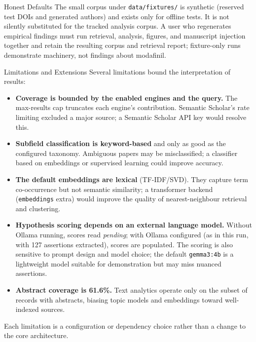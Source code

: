 \documentclass[
  ignorenonframetext,
]{beamer}
\begin{document}
\begin{frame}{Honest Defaults}
\protect{}\label{honest-defaults}
The small corpus under \texttt{data/fixtures/} is synthetic (reserved
test DOIs and generated authors) and exists only for offline tests. It
is not silently substituted for the tracked analysis corpus. A user who
regenerates empirical findings must run retrieval, analysis, figures,
and manuscript injection together and retain the resulting corpus and
retrieval report; fixture-only runs demonstrate machinery, not findings
about modafinil.
\end{frame}

\begin{frame}{Limitations and Extensions}
\protect{}\label{limitations-and-extensions}
Several limitations bound the interpretation of results:

\begin{itemize}
\item
  \textbf{Coverage is bounded by the enabled engines and the query.} The
  max-results cap truncates each engine's contribution. Semantic
  Scholar's rate limiting excluded a major source; a Semantic Scholar
  API key would resolve this.
\item
  \textbf{Subfield classification is keyword-based} and only as good as
  the configured taxonomy. Ambiguous papers may be misclassified; a
  classifier based on embeddings or supervised learning could improve
  accuracy.
\item
  \textbf{The default embeddings are lexical} (TF-IDF/SVD). They capture
  term co-occurrence but not semantic similarity; a transformer backend
  (\texttt{embeddings} extra) would improve the quality of
  nearest-neighbour retrieval and clustering.
\item
  \textbf{Hypothesis scoring depends on an external language model.}
  Without Ollama running, scores read \emph{pending}; with Ollama
  configured (as in this run, with 127 assertions extracted), scores are
  populated. The scoring is also sensitive to prompt design and model
  choice; the default \texttt{gemma3:4b} is a lightweight model suitable
  for demonstration but may miss nuanced assertions.
\item
  \textbf{Abstract coverage is 61.6\%.} Text analytics operate only on
  the subset of records with abstracts, biasing topic models and
  embeddings toward well-indexed sources.
\end{itemize}

Each limitation is a configuration or dependency choice rather than a
change to the core architecture.
\end{frame}
\end{document}
